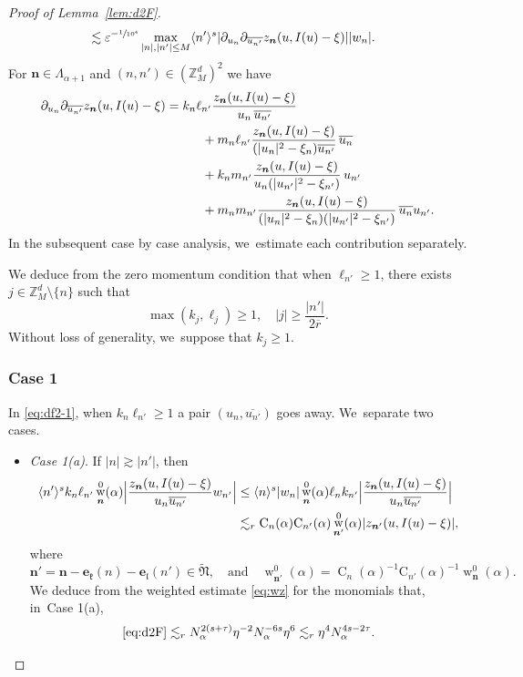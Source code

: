 \documentclass[10pt,a4paper]{amsart}
\DeclareMathOperator{\rw}{w}
\theoremstyle{plain}
\theoremstyle{definition}
\newcommand{\nb}{{\boldsymbol n}}
\newcommand{\Nb}{{\boldsymbol{\mathfrak{N}}}}
\newcommand{\Z}{\mathbb{Z}}
\newcommand{\1}{\mathbf{1}}
\let\epsilon\varepsilon
\begin{document}
\begin{proof}[Proof of Lemma~\ref{lem:d2F}]
\begin{align}
\label{eq:wasa}
&\lesssim \epsilon^{-\sfrac{1}{10^{4}}}
\max_{|n|,|n'|\leq M}
\langle n'\rangle^{s}
|\partial_{u_{n}}\partial_{\overline{u_{n'}}}z_{\nb}(u,I(u)-\xi)|
|w_{n}|.
\end{align}
For $\nb\in\Lambda_{\alpha+1}$ and $(n,n')\in(\Z_{M}^{d})^{2}$ we have
\begin{align}
\label{eq:df2-1}
\partial_{u_n}\partial_{\overline{u_{n'}}}
z_{\nb}(u,I(u)-\xi)
&= k_{n}\ell_{n'}
\frac{z_{\nb}(u,I(u)-\xi)}{u_{n}\,\overline{u_{n'}}}\\
\label{eq:df2-2}
&\hspace*{1cm}+m_n\ell_{n'}
\frac{z_{\nb}(u,I(u)-\xi)}{(|u_{n}|^{2}-\xi_{n})\overline{u_{n'}}}\,\overline{u_{n}}\\
\label{eq:df2-3}
&
\hspace*{1cm}+k_{n}m_{n'}
\frac{z_{\nb}(u,I(u)-\xi)}{u_{n}(|u_{n'}|^{2}-\xi_{n'})}\,
u_{n'}\\
\label{eq:df2-4}
&\hspace*{1cm}+m_nm_{n'}
\frac{z_{\nb}(u,I(u)-\xi)}{(|u_{n}|^{2}-\xi_{n})(|u_{n'}|^{2}-\xi_{n'})}\,
\overline{u_{n}}u_{n'}.
\end{align}
In the subsequent case by case analysis, we~estimate each contribution separately.

We deduce from the zero momentum condition that when $\ell_{n'}\geq1$, there exists
$j\in\Z_{M}^{d}\setminus\{n\}$ such that
\begin{equation}
\label{eq:j}
\max(k_j,\ell_{j})\geq1,\quad |j|\geq\frac{|n'|}{2\overline{r}}.
\end{equation}
Without loss of generality, we~suppose that $k_{j}\geq1$.

\subsubsection*{Case 1} In \eqref{eq:df2-1}, when $k_{n}\ell_{n'}\geq1$ a pair $(u_{n},\overline{u_{n'}})$ goes away. We~separate two cases.
\begin{itemize}
\item
\textit{Case 1(a)}. If
$
|n|\gtrsim |n'|
$,
then
\begin{align*}
\langle n'\rangle^{s}
k_{n}\ell_{n'}
\rw_{\nb}^{0}(\alpha)
\Bigl|
\frac{z_{\nb}(u,I(u)-\xi)}{u_{n}\overline{u_{n'}}}
w_{n'}
\Bigr|
&\leq \langle n\rangle^{s}|w_{n}|\rw_{\nb}^{0}(\alpha)\ell_nk_{n'}\Bigl|\frac{z_{\nb}(u,I(u)-\xi)}{u_{n}\overline{u_{n'}}}\Bigr| \\
&\lesssim_{r}
\operatorname{C}_{n}(\alpha)\mathrm{C}_{n'}(\alpha)
\rw_{\nb'}^{0}(\alpha)
|z_{\nb'}(u,I(u)-\xi)|,
\end{align*}
where
\[
\nb' =
\nb - \boldsymbol{e}_{\mathfrak{k}}(n)-\boldsymbol{e}_{\mathfrak{l}}(n') \in \widetilde{\Nb},\quad\text{and}\quad \rw_{\nb'}^{0}(\alpha)
= \operatorname{C}_{n}(\alpha)^{-1}
\mathrm{C}_{n'}(\alpha)^{-1}
\rw_{\nb}^{0}(\alpha).
\]
We deduce from the weighted estimate \eqref{eq:wz} for the monomials that, in~Case 1(a),
\[
\eqref{eq:d2F}\lesssim_{r}
N_{\alpha}^{2(s+\tau)}
\eta^{-2} N_{\alpha}^{-6s}\eta^{6} \lesssim_{r} \eta^{4}N_{\alpha}^{4s-2\tau}.
\]


\end{itemize}
\end{proof}
\end{document}
